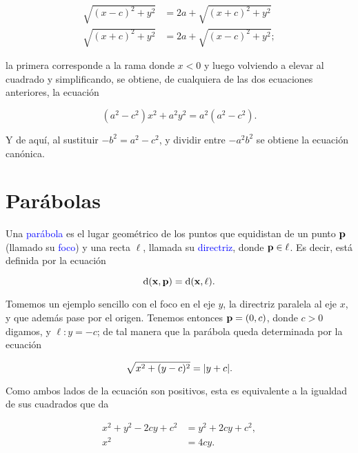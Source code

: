 \documentclass{article}
\theoremstyle{definicion}
\theoremstyle{definition}             %
\theoremstyle{definition}             %
\theoremstyle{definition}
\theoremstyle{definition}
\theoremstyle{observacion}
\theoremstyle{definition}
\theoremstyle{plain}
\theoremstyle{definition}
\theoremstyle{afirmacion}
\theoremstyle{notation}
\theoremstyle{definition}
\begin{document}
    \begin{align*}
        \sqrt{(x - c)^{2} + y^{2}} &= 2a + \sqrt{(x + c)^{2} + y^{2}} \\
        \sqrt{(x + c)^{2} + y^{2}} &= 2a + \sqrt{(x - c)^{2} + y^{2}};
    \end{align*}

    la primera corresponde a la rama donde \(x < 0\) y luego volviendo a elevar al cuadrado y simplificando, se obtiene, de cualquiera de las dos ecuaciones anteriores, la ecuación 

    \begin{equation*}
        (a^{2} - c^{2})x^{2} + a^{2}y^{2} = a^{2}(a^{2} - c^{2}).
    \end{equation*}

    Y de aquí, al sustituir \(-b^{2} = a^{2} - c^{2}\), y dividir entre \(-a^{2}b^{2}\) se obtiene la ecuación canónica.

    \section{Parábolas}

    Una \textcolor{blue}{parábola} es el lugar geométrico de los puntos que equidistan de un punto \(\vb{p}\) (llamado su \textcolor{blue}{foco}) y una recta \(\ell\), llamada su \textcolor{blue}{directriz}, donde \(\vb{p} \in \ell\). Es decir, está definida por la ecuación

    \begin{equation*}
        \textrm{d}(\vb{x}, \vb{p}) = \textrm{d}(\vb{x}, \ell).
    \end{equation*}

    Tomemos un ejemplo sencillo con el foco en el eje \(y\), la directriz paralela al eje \(x\), y que además pase por el origen. Tenemos entonces \(\vb{p} = (0, c)\), donde \(c > 0\) digamos, y \(\ell \colon y = -c\); de tal manera que la parábola queda determinada por la ecuación 

    \begin{equation*}
        \sqrt{x^{2} + (y - c)^{2}} = \abs{y + c}.
    \end{equation*}

    Como ambos lados de la ecuación son positivos, esta es equivalente a la igualdad de sus cuadrados que da 

    \begin{align*}
        x^{2} + y^{2} -2cy + c^{2} &= y^{2} + 2cy + c^{2}, \\
        x^{2} &= 4cy.        
    \end{align*}
\end{document}
